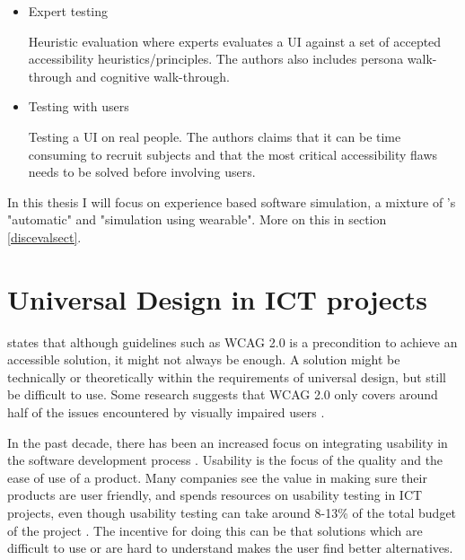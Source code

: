 \begin{itemize}
    \item Expert testing
    
    Heuristic evaluation where experts evaluates a UI against a set of accepted accessibility heuristics/principles. The authors also includes persona walk-through and cognitive walk-through.
    
    \item Testing with users
    
    Testing a UI on real people. The authors claims that it can be time consuming to recruit subjects and that the most critical accessibility flaws needs to be solved before involving users. 
\end{itemize}

In this thesis I will focus on experience based software simulation, a mixture of \textcite{bai_evaluation_2016}'s "automatic" and "simulation using wearable". More on this in section \ref{discevalsect}.

\section{Universal Design in ICT projects}
\textcite{fuglerud_link_2013} states that although guidelines such as WCAG 2.0 is a precondition to achieve an accessible solution, it might not always be enough. A solution might be technically or theoretically within the requirements of universal design, but still be difficult to use. Some research suggests that WCAG 2.0 only covers around half  of the issues encountered by visually impaired users \parencite{fuglerud_link_2013}.

In the past decade, there has been an increased focus on integrating usability in the software development process \parencite{bai2017cost}. Usability is the focus of the quality and the ease of use of a product. Many companies see the value in making sure their products are user friendly,  and spends resources on usability testing in ICT projects, even though usability testing can take around 8-13\% of the total budget of the project \parencite{bai2017cost}. The incentive for doing this can be that solutions which are difficult to use or are hard to understand makes the user find better alternatives. 

